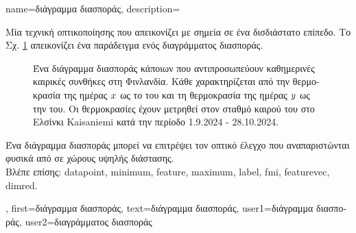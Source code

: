 {name={\foreignlanguage{greek}{διάγραμμα διασποράς}}, 
	description={\foreignlanguage{greek}{Μία} 
		\foreignlanguage{greek}{τεχνική οπτικοποίησης που απεικονίζει}  \foreignlanguage{greek}{με σημεία
		σε ένα δισδιάστατο επίπεδο. 
		Το Σχ.} \ref{fig_scatterplot_temp_FMI_dict} \foreignlanguage{greek}{απεικονίζει ένα παράδειγμα ενός διαγράμματος διασποράς.}   
		\begin{figure}[H]
			\begin{center}
				\vspace*{-10mm}
			\end{center}
			{
			\caption{\foreignlanguage{greek}{Ένα διάγραμμα διασποράς κάποιων}  \foreignlanguage{greek}{που 
				αντιπροσωπεύουν καθημερινές καιρικές συνθήκες στη Φινλανδία. Κάθε} 
				 \foreignlanguage{greek}{χαρακτηρίζεται από την}  
				\foreignlanguage{greek}{θερμοκρασία της ημέρας $x$ ως το} 
				 \foreignlanguage{greek}{του και τη}  \foreignlanguage{greek}{θερμοκρασία 
				της ημέρας $y$ ως την}  \foreignlanguage{greek}{του. 
				Οι θερμοκρασίες έχουν μετρηθεί στον σταθμό καιρού του}  \foreignlanguage{greek}{στο Ελσίνκι} 
				Kaisaniemi \foreignlanguage{greek}{κατά την περίοδο} 1.9.2024 - 28.10.2024.}
			\label{fig_scatterplot_temp_FMI_dict}}
			\vspace*{-3mm}
			\end{figure}
			\foreignlanguage{greek}{Ένα διάγραμμα διασποράς μπορεί να επιτρέψει τον οπτικό έλεγχο}  
			\foreignlanguage{greek}{που αναπαριστώνται φυσικά από}  
			\foreignlanguage{greek}{σε χώρους υψηλής διάστασης.}\\
			 \foreignlanguage{greek}{Βλέπε επίσης:} \gls{datapoint}, \gls{minimum}, \gls{feature}, \gls{maximum}, \gls{label}, \gls{fmi}, \gls{featurevec}, \gls{dimred}.},
		first={\foreignlanguage{greek}{διάγραμμα διασποράς}},
		text={\foreignlanguage{greek}{διάγραμμα διασποράς}},
		user1={\foreignlanguage{greek}{διάγραμμα διασποράς}}, %
  		user2={\foreignlanguage{greek}{διαγράμματος διασποράς}} %
}

